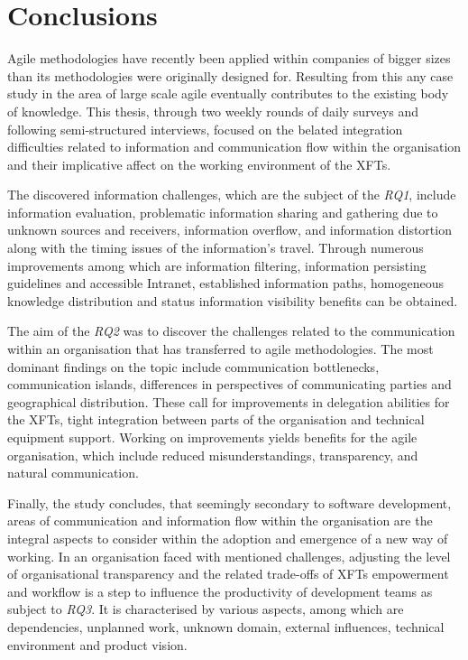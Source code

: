 \chapter{Conclusions}
\label{chap:conclusions}

Agile methodologies have recently been applied within companies of bigger sizes than its methodologies were originally designed for. Resulting from this any case study in the area of large scale agile eventually contributes to the existing body of knowledge. This thesis, through two weekly rounds of daily surveys and following semi-structured interviews, focused on the belated integration difficulties related to information and communication flow within the organisation and their implicative affect on the working environment of the \acp{XFT}.

The discovered information challenges, which are the subject of the \emph{RQ1}, include information evaluation, problematic information sharing and gathering due to unknown sources and receivers, information overflow, and information distortion along with the timing issues of the information's travel. Through numerous improvements among which are information filtering, information persisting guidelines and accessible Intranet, established information paths, homogeneous knowledge distribution and status information visibility benefits can be obtained.

The aim of the \emph{RQ2} was to discover the challenges related to the communication within an organisation that has transferred to agile methodologies. The most dominant findings on the topic include communication bottlenecks, communication islands, differences in perspectives of communicating parties and geographical distribution. These call for improvements in delegation abilities for the \acp{XFT}, tight integration between parts of the organisation and technical equipment support. Working on improvements yields benefits for the agile organisation, which include reduced misunderstandings, transparency, and natural communication.

Finally, the study concludes, that seemingly secondary to software development, areas of communication and information flow within the organisation are the integral aspects to consider within the adoption and emergence of a new way of working. In an organisation faced with mentioned challenges, adjusting the level of organisational transparency and the related trade-offs of \acp{XFT} empowerment and workflow is a step to influence the productivity of development teams as subject to \emph{RQ3}. It is characterised by various aspects, among which are dependencies, unplanned work, unknown domain, external influences, technical environment and product vision.

